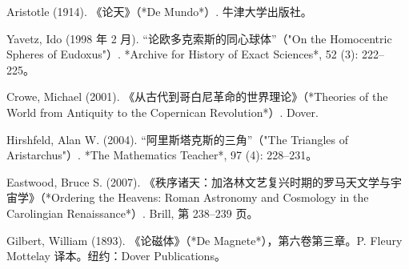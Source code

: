 \begin{enumerate}
Aristotle (1914). 《论天》（*De Mundo*）. 牛津大学出版社。  

Yavetz, Ido (1998 年 2 月). “论欧多克索斯的同心球体”（"On the Homocentric Spheres of Eudoxus"）. *Archive for History of Exact Sciences*, 52 (3): 222–225。  

Crowe, Michael (2001). 《从古代到哥白尼革命的世界理论》（*Theories of the World from Antiquity to the Copernican Revolution*）. Dover.  

Hirshfeld, Alan W. (2004). “阿里斯塔克斯的三角”（"The Triangles of Aristarchus"）. *The Mathematics Teacher*, 97 (4): 228–231。  

Eastwood, Bruce S. (2007). 《秩序诸天：加洛林文艺复兴时期的罗马天文学与宇宙学》（*Ordering the Heavens: Roman Astronomy and Cosmology in the Carolingian Renaissance*）. Brill, 第 238–239 页。  

Gilbert, William (1893). 《论磁体》（*De Magnete*），第六卷第三章。P. Fleury Mottelay 译本。纽约：Dover Publications。
\end{enumerate}


